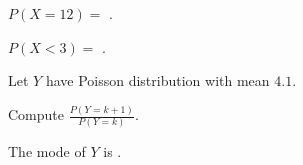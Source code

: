 \documentclass{ximera}
\begin{document}
\begin{question} 
     \begin{solution}
          $P(X=12) = $  .
     \end{solution}
\end{question}

\begin{question} 
     \begin{solution}
          $P(X<3) = $  .
     \end{solution}
\end{question}

Let $Y$ have Poisson distribution with mean $4.1$. 

\begin{question}
     \begin{hint}
          Compute $\frac{P(Y=k+1)}{P(Y=k)}$.
     \end{hint} 
     \begin{solution}
          The mode of $Y$ is  .
     \end{solution}
\end{question}
\end{document}
